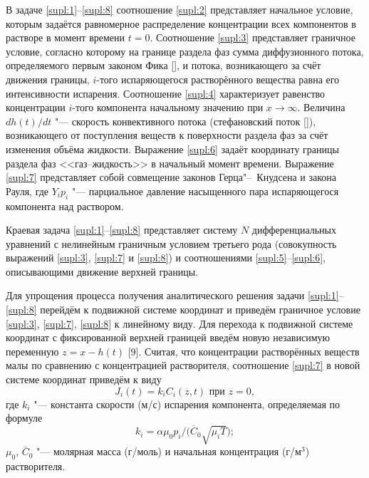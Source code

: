 В задаче \eqref{supl:1}--\eqref{supl:8} соотношение \eqref{supl:2} представляет начальное условие, которым задаётся равномерное распределение концентрации всех компонентов в растворе в момент времени $t = 0$. Соотношение \eqref{supl:3} представляет граничное условие, согласно которому на границе раздела фаз сумма диффузионного потока, определяемого первым законом Фика [], и потока, возникающего за счёт движения границы, $i$-того испаряющегося растворённого вещества равна его интенсивности испарения. 
Соотношение \eqref{supl:4} характеризует равенство концентрации $i$-того компонента начальному значению при $x \to \infty $. Величина $dh(t)/dt$ "--- скорость конвективного потока (стефановский поток []), возникающего от поступления веществ к поверхности раздела фаз за счёт изменения объёма жидкости. 
Выражение \eqref{supl:6} задаёт координату границы раздела фаз <<газ--жидкость>> в начальный момент времени.
Выражение \eqref{supl:7} представляет собой совмещение законов Герца"--~Кнудсена и закона Рауля, где $Y_{i}p_{i}$ "--- парциальное давление насыщенного пара испаряющегося компонента над раствором.

Краевая задача \eqref{supl:1}--\eqref{supl:8} представляет систему $N$ дифференциальных уравнений с нелинейным граничным условием третьего рода (совокупность выражений \eqref{supl:3}, \eqref{supl:7} и \eqref{supl:8}) и соотношениями \eqref{supl:5}--\eqref{supl:6}, описывающими движение верхней границы. 


Для упрощения процесса получения аналитического решения задачи \eqref{supl:1}--\eqref{supl:8} перейдём к подвижной системе координат и приведём граничное условие \eqref{supl:3}, \eqref{supl:7}, \eqref{supl:8} к линейному виду. Для перехода к подвижной системе координат с фиксированной верхней границей введём новую независимую переменную $z=x-h(t)$ [9]. Считая, что концентрации растворённых веществ малы по сравнению с концентрацией растворителя, соотношение \eqref{supl:7} в новой системе координат приведём к виду
\begin{equation}%
J_{i}(t)=k_{i}C_{i}(z,t) \text{ при } z=0,      
\label{supl:9}
\end{equation}
где $k_{i}$ "--- константа скорости (м/с) испарения компонента, определяемая по формуле
\begin{equation}%
k_{i}=\alpha \mu_{0}p_{i}/\big(\overline{C}_{0}\sqrt{\mu_{i}T} \big);       
\label{supl:10}
\end{equation}
$\mu_{0}$, $\overline{C}_{0}$ "--- молярная масса (г/моль) и начальная концентрация (г/м$^3$) растворителя.

